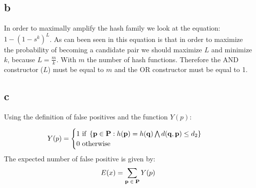 \documentclass[a4paper,12pt]{article}
\begin{document}
\subsection{b}
In order to maximally amplify the hash family we look at the equation: $1-(1-s^k)^L$. As can been seen in this equation is that in order to maximize the probability of becoming a candidate pair we should maximize $L$ and minimize $k$, because $L=\frac{m}{k}$. With $m$ the number of hash functions. Therefore the AND constructor ($L$) must be equal to $m$ and the OR constructor must be equal to 1. 

\subsection{c}
Using the definition of false positives and the function $Y(p)$:

\begin{equation}
\begin{aligned}
Y(p)= \begin{cases}
\text{1 if } \left\{ {\bf p} \in {\bf P}: h({\bf p})=h({\bf q}) \bigwedge d({\bf q}, {\bf p}) \leq d_2 \right\}\\
\text{0 otherwise} \end{cases}
\end{aligned}
\end{equation}
The expected number of false positive is given by:
\begin{equation}
\begin{aligned}
E(x)=\sum_{{\bf p}\; \in \;  {\bf P}}Y(p)
\end{aligned}
\end{equation}
\end{document}
